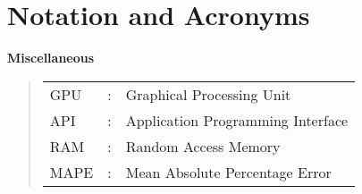 \documentclass[../dissertation.tex]{subfiles}
\begin{document}
\chapter*{Notation and Acronyms}

\begin{comment}
{\bf An optional section, of roughly $1$ or $2$ pages}
\vspace{1cm} 

\noindent
Any well written document will introduce notation and acronyms before
their use, {\em even if} they are standard in some way: this ensures 
any reader can understand the resulting self-contained content.  

Said introduction can exist within the dissertation itself, wherever 
that is appropriate.  For an acronym, this is typically achieved at 
the first point of use via ``Advanced Encryption Standard (AES)'' or 
similar, noting the capitalisation of relevant letters.  However, it 
can be useful to include an additional, dedicated list at the start 
of the dissertation; the advantage of doing so is that you cannot 
mistakenly use an acronym before defining it.  A limited example is 
as follows:
\end{comment}

\noindent
\textbf{Miscellaneous}
\begin{quote}
\noindent
\begin{tabular}{lcl}

GPU  &: & Graphical Processing Unit\\
API  &: & Application Programming Interface\\
RAM  &: & Random Access Memory\\
MAPE  &: & Mean Absolute Percentage Error\\

\end{tabular}
\end{quote}
\end{document}
